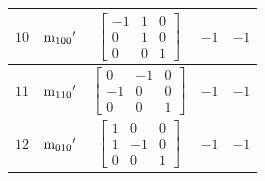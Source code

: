 \documentclass[fleqn,8pt]{jsarticle}
\begin{document}
\begin{longtable}{ccccc}
$ 10 $ & $ {\rm m}_{100}{}' $ & $ \begin{bmatrix} -1 & 1 & 0 \\ 0 & 1 & 0 \\ 0 & 0 & 1 \end{bmatrix} $ & $ -1 $ & $ -1 $ \\ \hline
$ 11 $ & $ {\rm m}_{110}{}' $ & $ \begin{bmatrix} 0 & -1 & 0 \\ -1 & 0 & 0 \\ 0 & 0 & 1 \end{bmatrix} $ & $ -1 $ & $ -1 $ \\ \hline
$ 12 $ & $ {\rm m}_{010}{}' $ & $ \begin{bmatrix} 1 & 0 & 0 \\ 1 & -1 & 0 \\ 0 & 0 & 1 \end{bmatrix} $ & $ -1 $ & $ -1 $ \\
\end{longtable}
\end{document}

